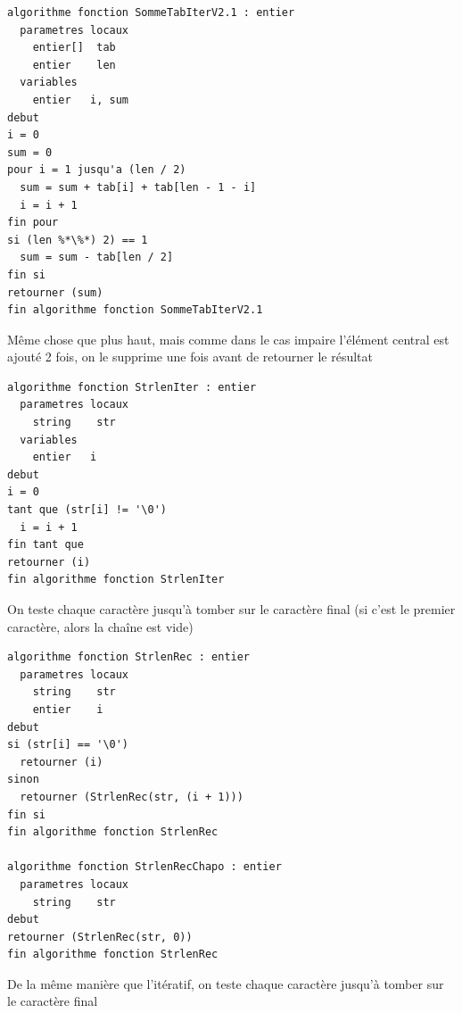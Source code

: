 \documentclass[11pt,a4paper]{article}
\begin{document}
\begin{table}[ht!]
  \centering
\begin{lstlisting}[style=algorithmique]
algorithme fonction SommeTabIterV2.1 : entier
  parametres locaux
    entier[]  tab
    entier    len
  variables
    entier   i, sum
debut
i = 0
sum = 0
pour i = 1 jusqu'a (len / 2)
  sum = sum + tab[i] + tab[len - 1 - i]
  i = i + 1
fin pour
si (len %*\%*) 2) == 1
  sum = sum - tab[len / 2]
fin si
retourner (sum)
fin algorithme fonction SommeTabIterV2.1 \end{lstlisting}
  \caption{Même chose que plus haut, mais comme dans le cas impaire l'élément central est ajouté 2 fois, on le supprime une fois avant de retourner le résultat}
\end{table}


\bigskip


\begin{table}[ht!]
  \centering
\begin{lstlisting}[style=algorithmique]
algorithme fonction StrlenIter : entier
  parametres locaux
    string    str
  variables
    entier   i
debut
i = 0
tant que (str[i] != '\0')
  i = i + 1
fin tant que
retourner (i)
fin algorithme fonction StrlenIter \end{lstlisting}
  \caption{On teste chaque caractère jusqu'à tomber sur le caractère final (si c'est le premier caractère, alors la chaîne est vide)}
\end{table}

\clearpage

\vfillFirst

\begin{table}[ht!]
  \centering
\begin{lstlisting}[style=algorithmique]
algorithme fonction StrlenRec : entier
  parametres locaux
    string    str
    entier    i
debut
si (str[i] == '\0')
  retourner (i)
sinon
  retourner (StrlenRec(str, (i + 1)))
fin si
fin algorithme fonction StrlenRec

algorithme fonction StrlenRecChapo : entier
  parametres locaux
    string    str
debut
retourner (StrlenRec(str, 0))
fin algorithme fonction StrlenRec \end{lstlisting}
  \caption{De la même manière que l'itératif, on teste chaque caractère jusqu'à tomber sur le caractère final}
\end{table}
\end{document}
